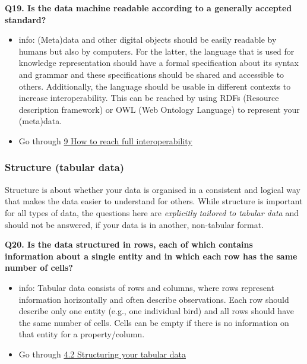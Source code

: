\documentclass[
]{book}
\providecommand{\tightlist}{%
  \setlength{\itemsep}{0pt}\setlength{\parskip}{0pt}}
\begin{document}
\textbf{Q19. Is the data machine readable according to a generally accepted standard?}

\begin{itemize}
\tightlist
\item
  info: (Meta)data and other digital objects should be easily readable by humans but also by computers. For the latter, the language that is used for knowledge representation should have a formal specification about its syntax and grammar and these specifications should be shared and accessible to others. Additionally, the language should be usable in different contexts to increase interoperability. This can be reached by using RDFs (Resource description framework) or OWL (Web Ontology Language) to represent your (meta)data.
\item
  Go through \protect\hyperlink{fully-interoperable}{9 How to reach full interoperability}
\end{itemize}

\hypertarget{structure-tabular-data}{%
\subsubsection*{Structure (tabular data)}\label{structure-tabular-data}}

Structure is about whether your data is organised in a consistent and logical way that makes the data easier to understand for others. While structure is important for all types of data, the questions here are \emph{explicitly tailored to tabular data} and should not be answered, if your data is in another, non-tabular format.

\textbf{Q20. Is the data structured in rows, each of which contains information about a single entity and in which each row has the same number of cells?}

\begin{itemize}
\tightlist
\item
  info: Tabular data consists of rows and columns, where rows represent information horizontally and often describe observations. Each row should describe only one entity (e.g., one individual bird) and all rows should have the same number of cells. Cells can be empty if there is no information on that entity for a property/column.
\item
  Go through \protect\hyperlink{structuring-your-tabular-data}{4.2 Structuring your tabular data}
\end{itemize}
\end{document}

